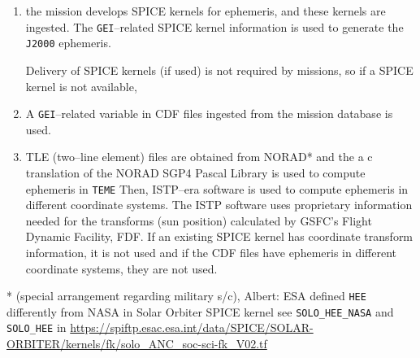 \documentclass[draft]{agujournal2019}
\begin{document}
\begin{enumerate}
    \parskip 0.1in 

    \item the mission develops SPICE kernels for ephemeris, and these kernels are ingested. The \texttt{GEI}--related SPICE kernel information is used to generate the \texttt{J2000} ephemeris.

    Delivery of SPICE kernels (if used) is not required by missions, so if a SPICE kernel is not available,

    \item A \texttt{GEI}--related variable in CDF files ingested from the mission database is used.

    \item TLE (two--line element) files are obtained from NORAD* and the a c translation of the NORAD SGP4 Pascal Library \cite{NORADSGP4c} is used to compute ephemeris in \texttt{TEME} Then, ISTP--era software is used to compute ephemeris in different coordinate systems. The ISTP software uses proprietary information needed for the transforms (sun position) calculated by GSFC's Flight Dynamic Facility, FDF. If an existing SPICE kernel has coordinate transform information, it is not used and if the CDF files have ephemeris in different coordinate systems, they are not used.

\end{enumerate}

* (special arrangement regarding military s/c),
Albert: ESA defined \texttt{HEE} differently from NASA in Solar Orbiter SPICE kernel see \texttt{SOLO\_HEE\_NASA} and \texttt{SOLO\_HEE} in \url{https://spiftp.esac.esa.int/data/SPICE/SOLAR-ORBITER/kernels/fk/solo_ANC_soc-sci-fk_V02.tf}

\end{document}
